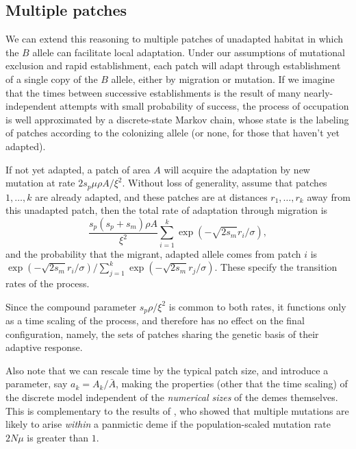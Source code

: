 \documentclass{article}
\begin{document}
\subsection{Multiple patches}


We can extend this reasoning to multiple patches of unadapted habitat 
in which the $B$ allele can facilitate local adaptation. 
Under our assumptions of mutational exclusion and rapid establishment, 
each patch will adapt through establishment of a single copy of the $B$ allele, 
either by migration or mutation.
If we imagine that the times between successive establishments is the result of many nearly-independent attempts
with small probability of success,
the process of occupation is well approximated by a discrete-state Markov chain,
whose state is the labeling of patches according to the colonizing allele
(or none, for those that haven't yet adapted).

If not yet adapted,
a patch of area $A$ will acquire the adaptation by new mutation at rate $2 s_p \mu \rho A/\xi^2$.
Without loss of generality, assume that patches $1, \ldots, k$ are already adapted,
and these patches are at distances $r_1, \ldots, r_k$ away from this unadapted patch, 
then the total rate of adaptation through migration is
\begin{equation}
  \frac{ s_p (s_p+s_m) \rho A}{\xi^2} \sum_{i=1}^{k} \exp\left(- \sqrt{2 s_m} r_i/\sigma\right),
\end{equation}
and the probability that the migrant, adapted allele 
comes from patch $i$ is $\exp\left(- \sqrt{2 s_m} r_i/\sigma\right)/\sum_{j=1}^{k} \exp\left(- \sqrt{2 s_m} r_j/\sigma\right)$.
These specify the transition rates of the process.

Since the compound parameter $s_p \rho / \xi^2$ is common to both rates,
it functions only as a time scaling of the process, 
and therefore has no effect on the final configuration, namely, 
the sets of patches sharing the genetic basis of their adaptive response.

Also note that we can rescale time by the typical patch size, and introduce a parameter, say $a_k = A_k/\bar A$,
making the properties (other that the time scaling) of the discrete model independent of the \emph{numerical sizes} of the demes themselves.
This is complementary to the results of \cite{softsweepsII}, who showed that multiple mutations are likely to arise \emph{within} a panmictic deme
if the population-scaled mutation rate $2 N \mu$ is greater than $1$.
\end{document}

